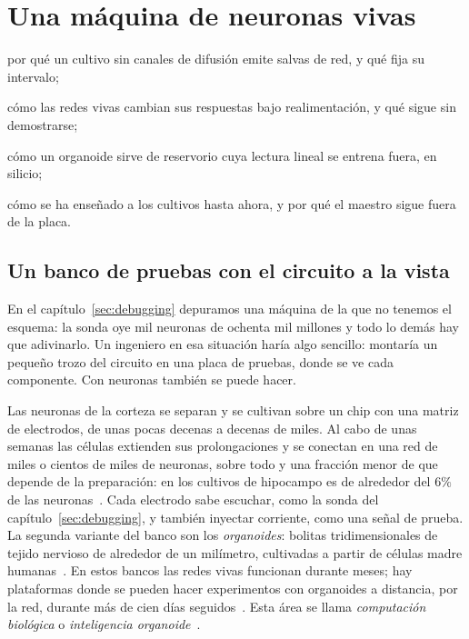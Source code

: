 \chapter{Una máquina de neuronas vivas}
\label{sec:livingmachine}
\begin{chaptergoals}
\item por qué un cultivo sin canales de difusión emite salvas de red, y qué fija su intervalo;
\item cómo las redes vivas cambian sus respuestas bajo realimentación, y qué sigue sin demostrarse;
\item cómo un organoide sirve de reservorio cuya lectura lineal se entrena fuera, en silicio;
\item cómo se ha enseñado a los cultivos hasta ahora, y por qué el maestro sigue fuera de la placa.
\end{chaptergoals}

\section{Un banco de pruebas con el circuito a la vista}

En el capítulo~\ref{sec:debugging} depuramos una máquina de la que no tenemos el esquema: la sonda oye mil neuronas de ochenta mil millones y todo lo demás hay que adivinarlo. Un ingeniero en esa situación haría algo sencillo: montaría un pequeño trozo del circuito en una placa de pruebas, donde se ve cada componente. Con neuronas también se puede hacer.

Las neuronas de la corteza se separan y se cultivan sobre un chip con una matriz de electrodos, de unas pocas decenas a decenas de miles. Al cabo de unas semanas las células extienden sus prolongaciones y se conectan en una red de miles o cientos de miles de neuronas, sobre todo  y una fracción menor de  que depende de la preparación: en los cultivos de hipocampo es de alrededor del $6\%$ de las neuronas~\cite{Benson1994}. Cada electrodo sabe escuchar, como la sonda del capítulo~\ref{sec:debugging}, y también inyectar corriente, como una señal de prueba. La segunda variante del banco son los \emph{organoides}: bolitas tridimensionales de tejido nervioso de alrededor de un milímetro, cultivadas a partir de células madre humanas~\cite{Lancaster2013}. En estos bancos las redes vivas funcionan durante meses; hay plataformas donde se pueden hacer experimentos con organoides a distancia, por la red, durante más de cien días seguidos~\cite{Jordan2024}. Esta área se llama \emph{computación biológica} o \emph{inteligencia organoide}~\cite{Smirnova2023}.

